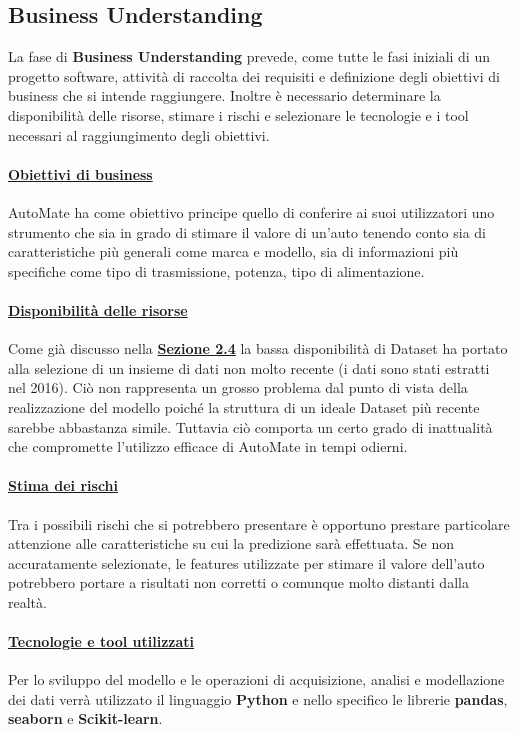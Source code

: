 \subsection{Business Understanding}
La fase di \textbf{Business Understanding} prevede, come tutte le fasi iniziali di un progetto software, attività di raccolta dei requisiti e definizione degli obiettivi di business che si intende raggiungere. Inoltre è necessario determinare la disponibilità delle risorse, stimare i rischi e selezionare le tecnologie e i tool necessari al raggiungimento degli obiettivi.

\paragraph{\textcolor[HTML]{000099}{\underline{Obiettivi di business}}}
AutoMate ha come obiettivo principe quello di conferire ai suoi utilizzatori uno strumento che sia in grado di stimare il valore di un'auto tenendo conto sia di caratteristiche più generali come marca e modello, sia di informazioni più specifiche come tipo di trasmissione, potenza, tipo di alimentazione.

\paragraph{\textcolor[HTML]{000099}{\underline{Disponibilità delle risorse}}}
Come già discusso nella \hyperref[sec:problematicheDataset]{\textbf{Sezione 2.4}}
la bassa disponibilità di Dataset ha portato alla selezione di un insieme di dati non molto recente (i dati sono stati estratti nel 2016). Ciò non rappresenta un grosso problema dal punto di vista della realizzazione del modello poiché la struttura di un ideale Dataset più recente sarebbe abbastanza simile. Tuttavia ciò comporta un certo grado di inattualità che compromette l'utilizzo efficace di AutoMate in tempi odierni.

\paragraph{\textcolor[HTML]{000099}{\underline{Stima dei rischi}}}
Tra i possibili rischi che si potrebbero presentare è opportuno prestare particolare attenzione alle caratteristiche su cui la predizione sarà effettuata. Se non accuratamente selezionate, le features utilizzate per stimare il valore dell'auto potrebbero portare a risultati non corretti o comunque molto distanti dalla realtà.

\paragraph{\textcolor[HTML]{000099}{\underline{Tecnologie e tool utilizzati}}}
Per lo sviluppo del modello e le operazioni di acquisizione, analisi e modellazione dei dati verrà utilizzato il linguaggio \textbf{Python} e nello specifico le librerie \textbf{pandas}, \textbf{seaborn} e \textbf{Scikit-learn}.
\pagebreak

